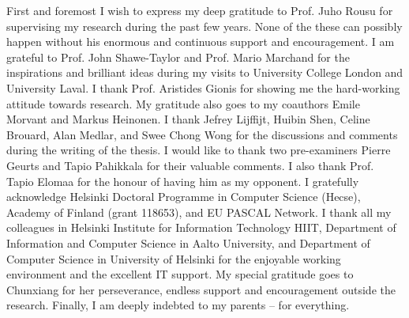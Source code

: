 

\begin{preface}[Espoo]

%
First and foremost I wish to express my deep gratitude to Prof. Juho Rousu for supervising my research during the past few years.
None of the these can possibly happen without his enormous and continuous support and encouragement.
%
I am grateful to Prof. John Shawe-Taylor and Prof. Mario Marchand for the inspirations and brilliant ideas during my visits to University College London and University Laval.
%
I thank Prof. Aristides Gionis for showing me the hard-working attitude towards research.
My gratitude also goes to my coauthors Emile Morvant and Markus Heinonen. 
%
I thank Jefrey Lijffijt, Huibin Shen, Celine Brouard, Alan Medlar, and Swee Chong Wong for the discussions and comments during the writing of the thesis.
I would like to thank two pre-examiners Pierre Geurts and Tapio Pahikkala for their valuable comments.
I also thank Prof. Tapio Elomaa for the honour of having him as my opponent.
%
I gratefully acknowledge Helsinki Doctoral Programme in Computer Science (Hecse), Academy of Finland (grant 118653), and EU PASCAL Network.
% 
I thank all my colleagues in Helsinki Institute for Information Technology HIIT, Department of Information and Computer Science in Aalto University, and Department of Computer Science in University of Helsinki for the enjoyable working environment and the excellent IT support.
%
My special gratitude goes to Chunxiang for her perseverance, endless support and encouragement outside the research.
%
Finally, I am deeply indebted to my parents -- for everything.


\end{preface}
